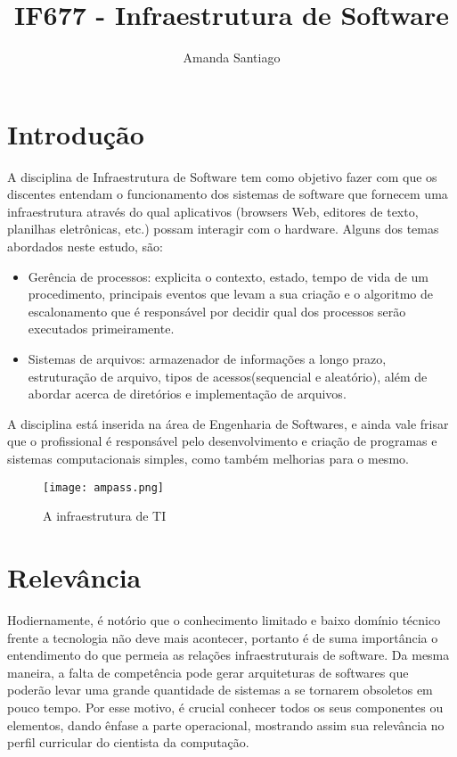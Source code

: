 \documentclass[10pt]{article}
\title{IF677 - Infraestrutura de Software}
\author{Amanda Santiago }
\date{\vspace{-5ex}}
\begin{document}
\maketitle

\section{Introdução}

A disciplina de Infraestrutura de Software tem como objetivo fazer com que os discentes entendam o funcionamento dos sistemas de software que fornecem uma infraestrutura através do qual aplicativos (browsers Web, editores de texto, planilhas eletrônicas, etc.) possam interagir com o hardware.\cite{cin.ufpe}
Alguns dos temas abordados neste estudo, são:
\begin{itemize}
    \item Gerência de processos: explicita o contexto, estado, tempo de vida de um procedimento, principais eventos que levam a sua criação e o algoritmo de escalonamento que é responsável por decidir qual dos processos serão executados primeiramente.\cite{processos}
    \item Sistemas de arquivos: armazenador de informações a longo prazo, estruturação de arquivo, tipos de acessos(sequencial e aleatório), além de abordar acerca de diretórios e implementação de arquivos.\cite{arquivos}
\end{itemize}

A disciplina está inserida na área de Engenharia de Softwares, e ainda vale frisar que o profissional é responsável pelo desenvolvimento e criação de programas e sistemas computacionais simples, como também melhorias para o mesmo.\cite{centro}

\begin{figure}[ht]
    \centering
    \texttt{[image: ampass.png]}
    \caption{A infraestrutura de TI}\cite{figura}
    \label{fig:my_label}
\end{figure}

\section{Relevância}
Hodiernamente, é notório que o conhecimento limitado e baixo domínio técnico frente a tecnologia não deve mais acontecer, portanto é de suma importância o entendimento do que permeia as relações infraestruturais de software. Da mesma maneira, a falta de competência pode gerar arquiteturas de softwares que poderão levar uma grande quantidade de sistemas a se tornarem obsoletos em pouco tempo. Por esse motivo, é crucial conhecer todos os seus componentes ou elementos, dando ênfase a parte operacional, mostrando assim sua relevância no perfil curricular do cientista da computação.\cite{fundacao}
\end{document}
